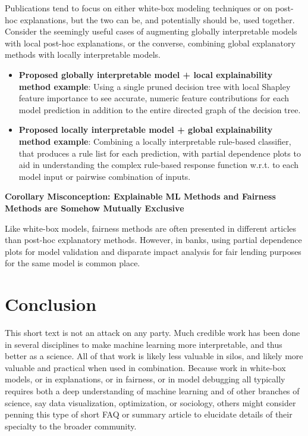 \documentclass{article}
\begin{document}
Publications tend to focus on either white-box modeling techniques or on post-hoc explanations, but the two can be, and potentially should be, used together. Consider the seemingly useful cases of augmenting globally interpretable models with local post-hoc explanations, or the converse, combining global explanatory methods with locally interpretable models.

\begin{itemize}
\item \textbf{Proposed globally interpretable model + local explainability method example}: Using a single pruned decision tree with local Shapley feature importance to see accurate, numeric feature contributions for each model prediction in addition to the entire directed graph of the decision tree.
\item \textbf{Proposed locally interpretable model + global explainability method example}: Combining a locally interpretable rule-based classifier, that produces a rule list for each prediction, with partial dependence plots to aid in understanding the complex rule-based response function w.r.t. to each model input or pairwise combination of inputs.  
\end{itemize}

\textbf{Corollary Misconception: Explainable ML Methods and Fairness Methods are Somehow Mutually Exclusive}

Like white-box models, fairness methods are often presented in different articles than post-hoc explanatory methods. However, in banks, using partial dependence plots for model validation and disparate impact analysis for fair lending purposes for the same model is common place.

\section{Conclusion}

This short text is not an attack on any party. Much credible work has been done in several disciplines to make machine learning more interpretable, and thus better as a science. All of that work is likely less valuable in silos, and likely more valuable and practical when used in combination. Because work in white-box models, or in explanations, or in fairness, or in model debugging all typically requires both a deep understanding of machine learning and of other branches of science, say data visualization, optimization, or sociology, others might consider penning this type of short FAQ or summary article to elucidate details of their specialty to the broader community.    




\end{document}
